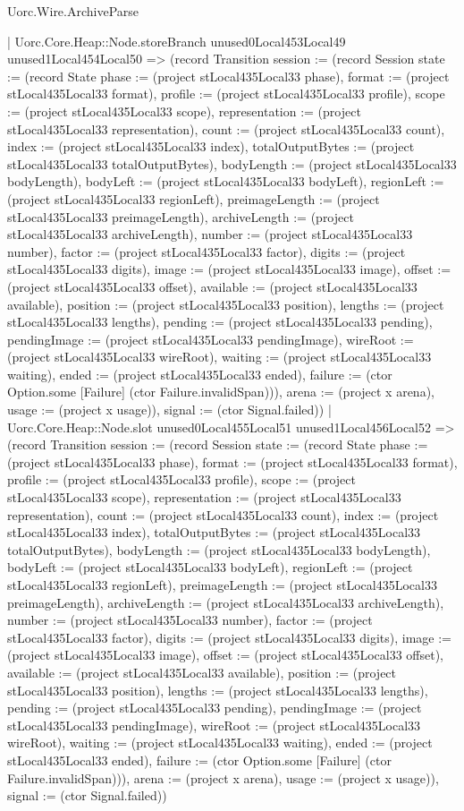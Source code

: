 \begin{lexlean}{Uorc.Wire.ArchiveParse}
\begin{semanticmodule}
{        | Uorc.Core.Heap::Node.storeBranch unused0Local453Local49 unused1Local454Local50 => (record Transition {session := (record Session {state := (record State {phase := (project stLocal435Local33 phase), format := (project stLocal435Local33 format), profile := (project stLocal435Local33 profile), scope := (project stLocal435Local33 scope), representation := (project stLocal435Local33 representation), count := (project stLocal435Local33 count), index := (project stLocal435Local33 index), totalOutputBytes := (project stLocal435Local33 totalOutputBytes), bodyLength := (project stLocal435Local33 bodyLength), bodyLeft := (project stLocal435Local33 bodyLeft), regionLeft := (project stLocal435Local33 regionLeft), preimageLength := (project stLocal435Local33 preimageLength), archiveLength := (project stLocal435Local33 archiveLength), number := (project stLocal435Local33 number), factor := (project stLocal435Local33 factor), digits := (project stLocal435Local33 digits), image := (project stLocal435Local33 image), offset := (project stLocal435Local33 offset), available := (project stLocal435Local33 available), position := (project stLocal435Local33 position), lengths := (project stLocal435Local33 lengths), pending := (project stLocal435Local33 pending), pendingImage := (project stLocal435Local33 pendingImage), wireRoot := (project stLocal435Local33 wireRoot), waiting := (project stLocal435Local33 waiting), ended := (project stLocal435Local33 ended), failure := (ctor Option.some [Failure] (ctor Failure.invalidSpan))}), arena := (project x arena), usage := (project x usage)}), signal := (ctor Signal.failed)})
        | Uorc.Core.Heap::Node.slot unused0Local455Local51 unused1Local456Local52 => (record Transition {session := (record Session {state := (record State {phase := (project stLocal435Local33 phase), format := (project stLocal435Local33 format), profile := (project stLocal435Local33 profile), scope := (project stLocal435Local33 scope), representation := (project stLocal435Local33 representation), count := (project stLocal435Local33 count), index := (project stLocal435Local33 index), totalOutputBytes := (project stLocal435Local33 totalOutputBytes), bodyLength := (project stLocal435Local33 bodyLength), bodyLeft := (project stLocal435Local33 bodyLeft), regionLeft := (project stLocal435Local33 regionLeft), preimageLength := (project stLocal435Local33 preimageLength), archiveLength := (project stLocal435Local33 archiveLength), number := (project stLocal435Local33 number), factor := (project stLocal435Local33 factor), digits := (project stLocal435Local33 digits), image := (project stLocal435Local33 image), offset := (project stLocal435Local33 offset), available := (project stLocal435Local33 available), position := (project stLocal435Local33 position), lengths := (project stLocal435Local33 lengths), pending := (project stLocal435Local33 pending), pendingImage := (project stLocal435Local33 pendingImage), wireRoot := (project stLocal435Local33 wireRoot), waiting := (project stLocal435Local33 waiting), ended := (project stLocal435Local33 ended), failure := (ctor Option.some [Failure] (ctor Failure.invalidSpan))}), arena := (project x arena), usage := (project x usage)}), signal := (ctor Signal.failed)})
}
\end{semanticmodule}
\end{lexlean}
